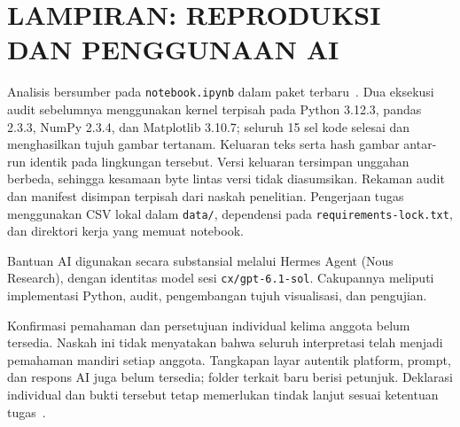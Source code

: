 \documentclass[12pt,a4paper]{article}
\begin{document}
\section*{LAMPIRAN: REPRODUKSI DAN PENGGUNAAN AI}
\begin{singlespace}
Analisis bersumber pada \texttt{notebook.ipynb} dalam paket terbaru~\cite{arsip}. Dua eksekusi audit sebelumnya menggunakan kernel terpisah pada Python 3.12.3, pandas 2.3.3, NumPy 2.3.4, dan Matplotlib 3.10.7; seluruh 15 sel kode selesai dan menghasilkan tujuh gambar tertanam. Keluaran teks serta hash gambar antar-run identik pada lingkungan tersebut. Versi keluaran tersimpan unggahan berbeda, sehingga kesamaan byte lintas versi tidak diasumsikan. Rekaman audit dan manifest disimpan terpisah dari naskah penelitian. Pengerjaan tugas menggunakan CSV lokal dalam \texttt{data/}, dependensi pada \texttt{requirements-lock.txt}, dan direktori kerja yang memuat notebook.

Bantuan AI digunakan secara substansial melalui Hermes Agent (Nous Research), dengan identitas model sesi \texttt{cx/gpt-6.1-sol}. Cakupannya meliputi implementasi Python, audit, pengembangan tujuh visualisasi, dan pengujian.

Konfirmasi pemahaman dan persetujuan individual kelima anggota belum tersedia. Naskah ini tidak menyatakan bahwa seluruh interpretasi telah menjadi pemahaman mandiri setiap anggota. Tangkapan layar autentik platform, prompt, dan respons AI juga belum tersedia; folder terkait baru berisi petunjuk. Deklarasi individual dan bukti tersebut tetap memerlukan tindak lanjut sesuai ketentuan tugas~\cite{rubrik}.
\end{singlespace}
\end{document}
